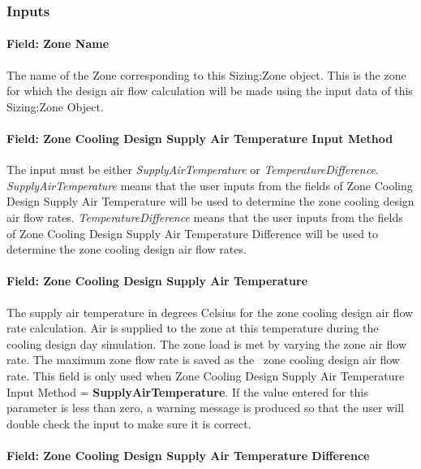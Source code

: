 \subsubsection{Inputs}\label{inputs-4-008}

\paragraph{Field: Zone Name}\label{field-zone-name-004}

The name of the Zone corresponding to this Sizing:Zone object. This is the zone for which the design air flow calculation will be made using the input data of this Sizing:Zone Object.

\paragraph{Field: Zone Cooling Design Supply Air Temperature Input Method}\label{field-zone-cooling-design-supply-air-temperature-input-method}

The input must be either \emph{SupplyAirTemperature} or \emph{TemperatureDifference}. \emph{SupplyAirTemperature} means that the user inputs from the fields of Zone Cooling Design Supply Air Temperature will be used to determine the zone cooling design air flow rates. \emph{TemperatureDifference} means that the user inputs from the fields of Zone Cooling Design Supply Air Temperature Difference will be used to determine the zone cooling design air flow rates.

\paragraph{Field: Zone Cooling Design Supply Air Temperature}\label{field-zone-cooling-design-supply-air-temperature}

The supply air temperature in degrees Celsius for the zone cooling design air flow rate calculation. Air is supplied to the zone at this temperature during the cooling design day simulation. The zone load is met by varying the zone air flow rate. The maximum zone flow rate is saved as the~ zone cooling design air flow rate. This field is only used when Zone Cooling Design Supply Air Temperature Input Method = \textbf{SupplyAirTemperature}. If the value entered for this parameter is less than zero, a warning message is produced so that the user will double check the input to make sure it is correct.

\paragraph{Field: Zone Cooling Design Supply Air Temperature Difference}\label{field-zone-cooling-design-supply-air-temperature-difference}

